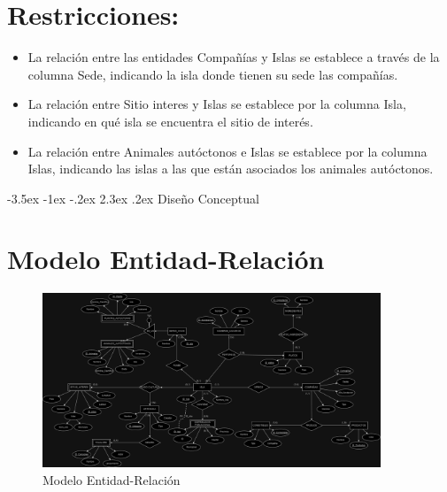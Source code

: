 \documentclass[11pt]{report}
\makeatletter
\renewcommand\chapter{\@startsection{chapter}{0}{\z@}%
    {-3.5ex \@plus -1ex \@minus -.2ex}%
    {2.3ex \@plus.2ex}%
    {\normalfont\Large\bfseries}}
\makeatother
\begin{document}
\section{Restricciones:}

\begin{itemize}
    \item La relación entre las entidades Compañías y Islas se establece a través de la columna Sede, indicando la isla donde tienen su sede las compañías.
    \item La relación entre Sitio interes y Islas se establece por la columna Isla, indicando en qué isla se encuentra el sitio de interés.
    \item La relación entre Animales autóctonos e Islas se establece por la columna Islas, indicando las islas a las que están asociados los animales autóctonos.
\end{itemize}
\chapter{Diseño Conceptual}

\section{Modelo Entidad-Relación}
\begin{figure}[H]
    \centering
    \includegraphics[width=0.9\textwidth]{../diagrams/ER-PF-ADBD.jpg}
    \caption{Modelo Entidad-Relación}
    \label{fig:modelo_er}
\end{figure}
\end{document}
